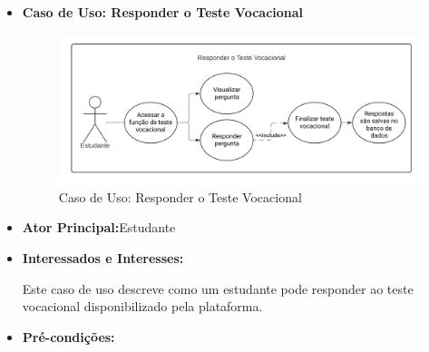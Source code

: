 \begin{itemize}
    \item \textbf{Caso de Uso: Responder o Teste Vocacional}

    \begin{figure}[ht]
        \centering
        \includegraphics[scale=0.8]{caso-de-uso_responder-teste-vocacional.png}
        \caption{Caso de Uso: Responder o Teste Vocacional}
        \label{fig:enter-label}
    \end{figure}

    \item \textbf{Ator Principal:}Estudante
    \item \textbf{Interessados e Interesses:}

    Este caso de uso descreve como um estudante pode responder ao teste vocacional disponibilizado pela plataforma.
    \item \textbf{Pré-condições: }


\end{itemize}
